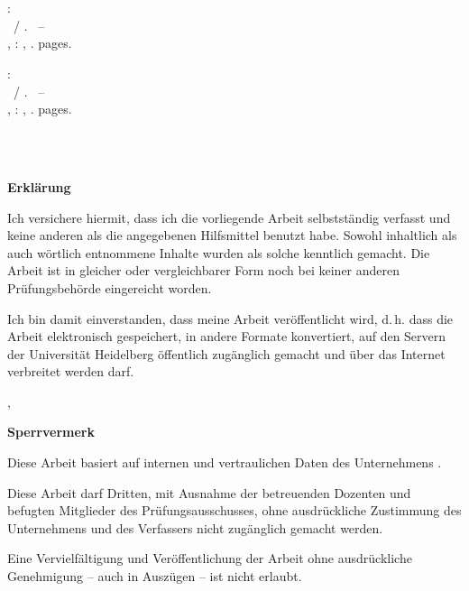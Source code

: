 \newcommand{\hsmabiben}{\begin{small}\textbf{\hsmaautorbib}: \\ \hsmatitelen \ / \hsmaautor. \ -- \\ \hsmatypen, \hsmaort : \hsmakoerperschaften, \hsmajahr. \pageref{lastpage} pages. \end{small}}

%
  {\hsmabibde \\ \vspace{0.5cm} \\ \hsmabiben}
  {\hsmabiben \\ \vspace{0.5cm} \\ \hsmabibde}

\clearpage\setcounter{page}{1}
\thispagestyle{empty}
\textsf{\large\textbf{Erklärung}}

Ich versichere hiermit, dass ich die vorliegende Arbeit selbstständig verfasst und keine anderen als die angegebenen Hilfsmittel benutzt habe. Sowohl inhaltlich als auch wörtlich entnommene Inhalte wurden als solche kenntlich gemacht. Die Arbeit ist in gleicher
oder vergleichbarer Form noch bei keiner anderen Prüfungsbehörde eingereicht worden.

%
{
\vspace{0.5cm}
Ich bin damit einverstanden, dass meine Arbeit veröffentlicht wird, d.\,h. dass die Arbeit elektronisch gespeichert, in andere Formate konvertiert, auf den Servern der Universität Heidelberg öffentlich zugänglich gemacht und über das Internet verbreitet werden darf. 
}{}%


\vspace{1cm}
\hsmaort, \hsmadatum \\

\vspace{1.2cm}						                                      
\hsmaautor

%
{%
\vspace{11cm}
\color{red}\textsf{\large\textbf{Sperrvermerk}}

Diese Arbeit basiert auf internen und vertraulichen Daten des Unternehmens \hsmafirma.

Diese Arbeit darf Dritten, mit Ausnahme der betreuenden Dozenten und befugten Mitglieder des Prüfungsausschusses, ohne ausdrückliche Zustimmung des Unternehmens und des Verfassers nicht zugänglich gemacht werden.

Eine Vervielfältigung und Veröffentlichung der Arbeit ohne ausdrückliche Genehmigung -- auch in Auszügen -- ist nicht erlaubt.
\color{black}
}{}

